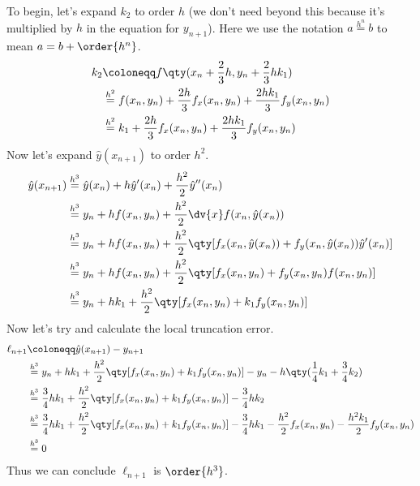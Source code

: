 \documentclass[boxes,pages]{homework}
\newcommand{\eqorder}[1]{\overset{h^#1}{=}}
\begin{document}
\begin{solution}
	To begin, let's expand $k_2$ to order $h$ (we don't need beyond this because it's multiplied by $h$ in the equation for $y_{n+1}$). Here we use the notation $a \eqorder{n} b$ to mean $a = b + \order{h^n}$.
	\begin{align*}
		k_2 & \coloneqq f\qty(x_n + \frac{2}{3}h, y_n + \frac{2}{3}hk_1)                         \\
		    & \eqorder{2} f(x_n, y_n) + \frac{2h}{3}f_x(x_n, y_n) + \frac{2hk_1}{3}f_y(x_n, y_n) \\
		    & \eqorder{2} k_1 + \frac{2h}{3}f_x(x_n, y_n) + \frac{2hk_1}{3}f_y(x_n, y_n)
	\end{align*}
	Now let's expand $\hat{y}(x_{n+1})$ to order $h^2$.
	\begin{align*}
		\hat{y}(x_{n+1}) & \eqorder{3} \hat{y}(x_n) + h\hat{y}'(x_n) + \frac{h^2}{2}\hat{y}''(x_n)                                          \\
		                 & \eqorder{3} y_n + hf(x_n, y_n) + \frac{h^2}{2}\dv{x}f(x_n, \hat{y}(x_n))                                         \\
		                 & \eqorder{3} y_n + hf(x_n, y_n) + \frac{h^2}{2}\qty[f_x(x_n, \hat{y}(x_n)) + f_y(x_n, \hat{y}(x_n))\hat{y}'(x_n)] \\
		                 & \eqorder{3} y_n + hf(x_n, y_n) + \frac{h^2}{2}\qty[f_x(x_n, y_n) + f_y(x_n, y_n)f(x_n, y_n)]                     \\
		                 & \eqorder{3} y_n + hk_1 + \frac{h^2}{2}\qty[f_x(x_n, y_n) + k_1f_y(x_n, y_n)]
	\end{align*}
	Now let's try and calculate the local truncation error.
	\begin{align*}
		\ell_{n+1} & \coloneqq \hat{y}(x_{n+1}) - y_{n+1}                                                                                                                             \\
		           & \eqorder{3} y_n + hk_1 + \frac{h^2}{2}\qty[f_x(x_n, y_n) + k_1f_y(x_n, y_n)] - y_n - h\qty(\frac{1}{4}k_1 + \frac{3}{4}k_2)                                      \\
		           & \eqorder{3} \frac{3}{4}hk_1 + \frac{h^2}{2}\qty[f_x(x_n, y_n) + k_1f_y(x_n, y_n)] - \frac{3}{4}hk_2                                                              \\
		           & \eqorder{3} \frac{3}{4}hk_1 + \frac{h^2}{2}\qty[f_x(x_n, y_n) + k_1f_y(x_n, y_n)] - \frac{3}{4}hk_1 - \frac{h^2}{2}f_x(x_n, y_n) - \frac{h^2k_1}{2}f_y(x_n, y_n) \\
		           & \eqorder{3} 0
	\end{align*}
	Thus we can conclude $\ell_{n+1}$ is $\order{h^3}$.
\end{solution}
\end{document}
